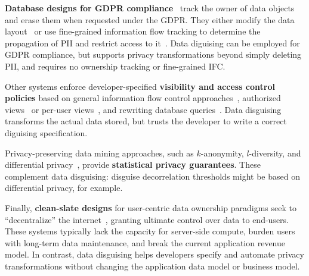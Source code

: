 \textbf{Database designs for GDPR compliance}~\cite{schengendb, usershards} track the owner of
data objects and erase them when requested under the GDPR.
%
They either modify the data layout~\cite{usershards} or use fine-grained information flow
tracking to determine the propagation of PII and restrict access to it~\cite{schengendb}.
%
Data diguising can be employed for GDPR compliance, but supports privacy transformations beyond
simply deleting PII, and requires no ownership tracking or fine-grained IFC.
%

%
Other systems enforce developer-specified \textbf{visibility and access control policies}
based on general information flow control approaches~\cite{static, jeeves, jif, hails, ifdb},
%
authorized views~\cite{oracle} or per-user views~\cite{multiverse}, and rewriting database queries~\cite{qapla, sieve}.
%
Data disguising transforms the actual data stored, but trusts the developer to write a
correct diguising specification.
%



Privacy-preserving data mining approaches, such as $k$-anonymity, $l$-diversity, and
differential privacy~\cite{dataminingmodels, differential}, provide \textbf{statistical privacy
guarantees}.
%
These complement data disguising: disguise decorrelation thresholds might be based on
differential privacy, for example.
%


Finally, \textbf{clean-slate designs} for user-centric data ownership paradigms seek to
``decentralize'' the internet~\cite{diy, solid, amber, oort, w5, blockstack, bstore, databox},
granting ultimate control over data to end-users.
%
These systems typically lack the capacity for server-side compute, burden users with long-term
data maintenance, and break the current application revenue model.
%
In contrast, data disguising helps developers specify and automate privacy transformations
without changing the application data model or business model.
%

